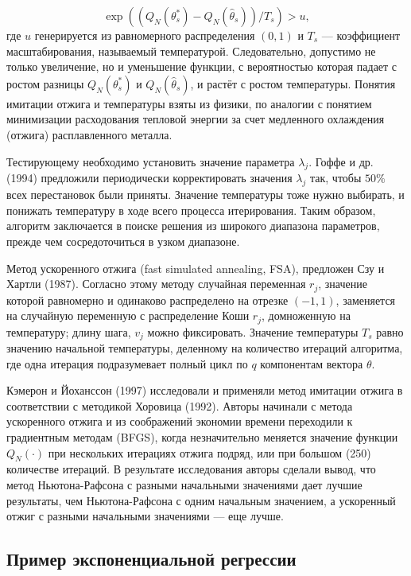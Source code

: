 \begin{equation}
\exp \left( (Q_{N}(\theta^{*}_s)-Q_{N}(\hat{\theta}_s))/T_s \right) >u,
\end{equation} 
где $u$ генерируется из равномерного распределения $(0,1)$ и $T_s$ --- коэффициент масштабирования, называемый температурой. Следовательно, допустимо не только увеличение, но и уменьшение функции, с вероятностью которая падает с ростом разницы $Q_{N}(\theta^{*}_s)$ и $Q_{N}(\hat{\theta}_s)$, и растёт с ростом температуры. Понятия имитации отжига и температуры взяты из физики, по аналогии с понятием минимизации расходования тепловой энергии за счет медленного охлаждения (отжига) расплавленного металла. 

Тестирующему необходимо установить значение параметра $\lambda_{j}$. Гоффе и др. (1994) предложили периодически корректировать значения $\lambda_{j}$ так, чтобы $50\%$ всех перестановок были приняты. Значение температуры тоже нужно выбирать, и понижать температуру в ходе всего процесса итерирования. Таким образом, алгоритм заключается в поиске решения из широкого диапазона параметров, прежде чем сосредоточиться в узком диапазоне.

Метод ускоренного отжига (fast simulated annealing, FSA), предложен Сзу и Хартли (1987). Согласно этому методу случайная переменная $r_j$, значение которой равномерно и одинаково распределено на отрезке $(-1,1)$, заменяется на случайную переменную с распределение Коши $r_j$, домноженную на температуру; длину шага, $v_j$ можно фиксировать. Значение температуры $T_s$ равно значению начальной температуры, деленному на количество итераций алгоритма, где одна итерация подразумевает полный цикл по $q$ компонентам вектора $\theta$.

Кэмерон и Йоханссон (1997) исследовали и применяли метод имитации отжига в соответствии с методикой Хоровица (1992). Авторы начинали с метода ускоренного отжига и из соображений экономии времени переходили к градиентным методам (BFGS), когда незначительно меняется значение функции $Q_{N}(\cdot)$ при нескольких итерациях отжига подряд, или при большом (250) количестве итераций. В результате исследования авторы сделали вывод, что метод Ньютона-Рафсона с разными начальными значениями дает лучшие результаты, чем Ньютона-Рафсона с одним начальным значением,  а ускоренный отжиг  с разными начальными значениями --- еще лучше.

\subsection{Пример экспоненциальной регрессии}

